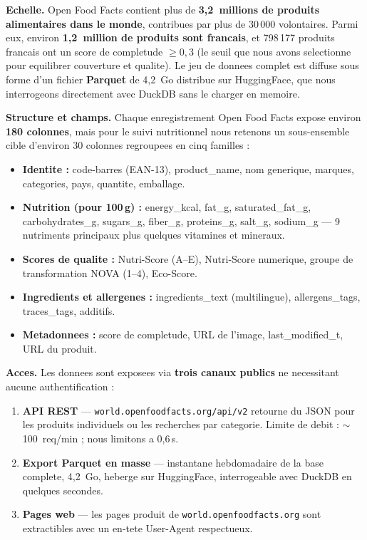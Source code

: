 \documentclass[a4paper,11pt,oneside,openany]{report}
\newcommand{\off}{Open Food Facts}
\begin{document}
\textbf{Echelle.} \off{} contient plus de \textbf{3,2~millions de
produits alimentaires dans le monde}, contribues par plus de
30\,000 volontaires. Parmi eux, environ \textbf{1,2~million de
produits sont francais}, et 798\,177 produits francais ont un score
de completude $\geq 0,3$ (le seuil que nous avons selectionne pour
equilibrer couverture et qualite). Le jeu de donnees complet est
diffuse sous forme d'un fichier \textbf{Parquet} de 4,2~Go distribue
sur HuggingFace, que nous interrogeons directement avec DuckDB sans
le charger en memoire.

\textbf{Structure et champs.} Chaque enregistrement \off{} expose
environ \textbf{180 colonnes}, mais pour le suivi nutritionnel nous
retenons un sous-ensemble cible d'environ 30 colonnes regroupees en
cinq familles :

\begin{itemize}[nosep]
  \item \textbf{Identite :} code-barres (EAN-13), product\_name, nom
        generique, marques, categories, pays, quantite, emballage.
  \item \textbf{Nutrition (pour 100\,g) :} energy\_kcal, fat\_g,
        saturated\_fat\_g, carbohydrates\_g, sugars\_g, fiber\_g,
        proteins\_g, salt\_g, sodium\_g --- 9 nutriments principaux
        plus quelques vitamines et mineraux.
  \item \textbf{Scores de qualite :} Nutri-Score (A--E),
        Nutri-Score numerique, groupe de transformation NOVA (1--4), Eco-Score.
  \item \textbf{Ingredients et allergenes :} ingredients\_text
        (multilingue), allergens\_tags, traces\_tags, additifs.
  \item \textbf{Metadonnees :} score de completude, URL de l'image,
        last\_modified\_t, URL du produit.
\end{itemize}

\textbf{Acces.} Les donnees sont exposees via \textbf{trois canaux
publics} ne necessitant aucune authentification :

\begin{enumerate}[nosep]
  \item \textbf{API REST} --- \texttt{world.openfoodfacts.org/api/v2}
        retourne du JSON pour les produits individuels ou les recherches
        par categorie. Limite de debit : $\sim$100~req/min ; nous
        limitons a 0,6\,s.
  \item \textbf{Export Parquet en masse} --- instantane hebdomadaire de
        la base complete, 4,2~Go, heberge sur HuggingFace, interrogeable
        avec DuckDB en quelques secondes.
  \item \textbf{Pages web} --- les pages produit de
        \texttt{world.openfoodfacts.org} sont extractibles avec un
        en-tete User-Agent respectueux.
\end{enumerate}
\end{document}
